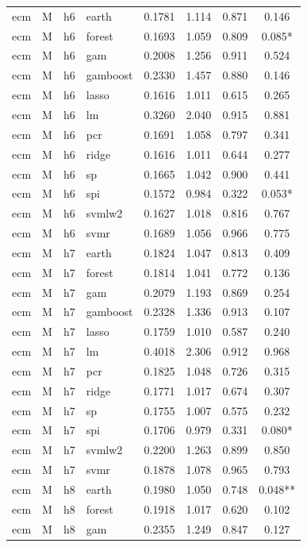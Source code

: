 \begin{ThreePartTable}
\begin{longtable}[t]{llclcccc}
\addlinespace
ecm & M & h6 & earth & 0.1781 & 1.114 & 0.871 & 0.146\\
ecm & M & h6 & forest & 0.1693 & 1.059 & 0.809 & 0.085*\\
ecm & M & h6 & gam & 0.2008 & 1.256 & 0.911 & 0.524\\
ecm & M & h6 & gamboost & 0.2330 & 1.457 & 0.880 & 0.146\\
ecm & M & h6 & lasso & 0.1616 & 1.011 & 0.615 & 0.265\\
ecm & M & h6 & lm & 0.3260 & 2.040 & 0.915 & 0.881\\
ecm & M & h6 & pcr & 0.1691 & 1.058 & 0.797 & 0.341\\
ecm & M & h6 & ridge & 0.1616 & 1.011 & 0.644 & 0.277\\
ecm & M & h6 & sp & 0.1665 & 1.042 & 0.900 & 0.441\\
ecm & M & h6 & spi & 0.1572 & 0.984 & 0.322 & 0.053*\\
ecm & M & h6 & svmlw2 & 0.1627 & 1.018 & 0.816 & 0.767\\
ecm & M & h6 & svmr & 0.1689 & 1.056 & 0.966 & 0.775\\
\addlinespace
ecm & M & h7 & earth & 0.1824 & 1.047 & 0.813 & 0.409\\
ecm & M & h7 & forest & 0.1814 & 1.041 & 0.772 & 0.136\\
ecm & M & h7 & gam & 0.2079 & 1.193 & 0.869 & 0.254\\
ecm & M & h7 & gamboost & 0.2328 & 1.336 & 0.913 & 0.107\\
ecm & M & h7 & lasso & 0.1759 & 1.010 & 0.587 & 0.240\\
ecm & M & h7 & lm & 0.4018 & 2.306 & 0.912 & 0.968\\
ecm & M & h7 & pcr & 0.1825 & 1.048 & 0.726 & 0.315\\
ecm & M & h7 & ridge & 0.1771 & 1.017 & 0.674 & 0.307\\
ecm & M & h7 & sp & 0.1755 & 1.007 & 0.575 & 0.232\\
ecm & M & h7 & spi & 0.1706 & 0.979 & 0.331 & 0.080*\\
ecm & M & h7 & svmlw2 & 0.2200 & 1.263 & 0.899 & 0.850\\
ecm & M & h7 & svmr & 0.1878 & 1.078 & 0.965 & 0.793\\
\addlinespace
ecm & M & h8 & earth & 0.1980 & 1.050 & 0.748 & 0.048**\\
ecm & M & h8 & forest & 0.1918 & 1.017 & 0.620 & 0.102\\
ecm & M & h8 & gam & 0.2355 & 1.249 & 0.847 & 0.127\\

\end{longtable}
\end{ThreePartTable}
